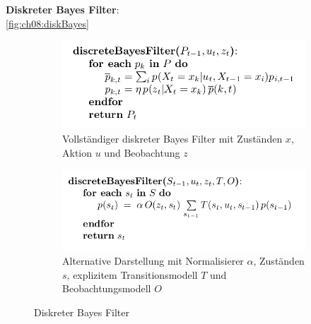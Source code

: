 \textbf{Diskreter Bayes Filter}:\\
\autoref{fig:ch08:diskBayes}

\begin{figure}[h!]
\centering
\begin{subfigure}{.5\textwidth}
  \centering
  \includegraphics[width=\linewidth]{figures/ch08_diskreterBayes.png}
  \caption{Vollst\"andiger diskreter Bayes Filter mit Zust\"anden $x$, Aktion $u$ und Beobachtung $z$}
  \label{fig:sub1}
\end{subfigure}%
\begin{subfigure}{.5\textwidth}
  \centering
  \includegraphics[width=\linewidth]{figures/ch08_diskreterBayesAlter.png}
  \caption{Alternative Darstellung mit Normalisierer $\alpha$, Zust\"anden $s$, explizitem Transitionsmodell $T$ und Beobachtungsmodell $O$}
  \label{fig:sub2}
\end{subfigure}
\caption{Diskreter Bayes Filter}
\label{fig:ch08:diskBayes}
\end{figure}

